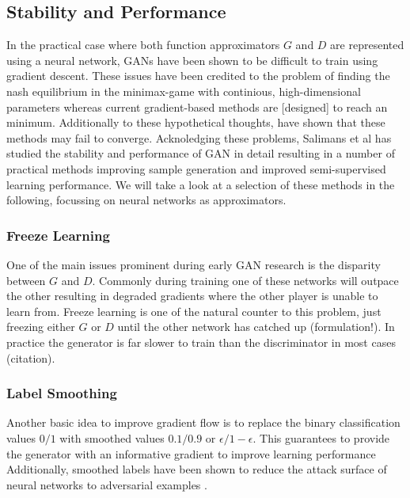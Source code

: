 
\subsection{Stability and Performance}
\label{sub:gan_stability}
In the practical case where both function approximators $G$ and $D$ are represented using a neural network,
GANs have been shown to be difficult to train using gradient descent.
These issues have been credited to the problem of finding the nash equilibrium in the minimax-game with continious, high-dimensional parameters whereas current gradient-based methods are [designed] to reach an minimum.
Additionally to these hypothetical thoughts, \cite{gan_distinguish_crit:2014} have shown that these methods may fail to converge.
Acknoledging these problems, Salimans et al \cite{improved_gan:2016} has studied the stability and performance of GAN in detail resulting in a number of practical methods improving sample generation and improved semi-supervised learning performance.
We will take a look at a selection of these methods in the following, focussing on neural networks as approximators.

\subsubsection{Freeze Learning}
\label{ssub:gan_freeze_learning}
One of the main issues prominent during early GAN research is the disparity between $G$ and $D$.
Commonly during training one of these networks will outpace the other resulting in degraded gradients where the other player is unable to learn from.
Freeze learning is one of the natural counter to this problem, just freezing either $G$ or $D$ until the other network has catched up (formulation!).
In practice the generator is far slower to train than the discriminator in most cases (citation).


\subsubsection{Label Smoothing}
\label{ssub:gan_label_smoothing}
Another basic idea to improve gradient flow is to replace the binary classification values $0/1$ with smoothed values $0.1/0.9$ or $\epsilon/1-\epsilon$.
This guarantees to provide the generator with an informative gradient to improve learning performance
Additionally, smoothed labels have been shown to reduce the attack surface of neural networks to adversarial examples \cite{adv_examples:2016}.


